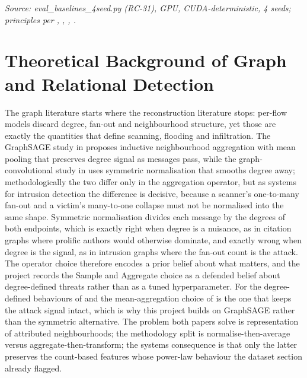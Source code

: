 {\small\textit{Source: eval\_baselines\_4seed.py (RC-31), GPU, CUDA-deterministic, 4 seeds; principles per \cite{k10}, \cite{k12}, \cite{k11}, \cite{k13}.}}

\section{Theoretical Background of Graph and Relational Detection}

The graph literature starts where the reconstruction literature stops: per-flow models discard degree, fan-out and neighbourhood structure, yet those are exactly the quantities that define scanning, flooding and infiltration. The GraphSAGE study in \cite{k14} proposes inductive neighbourhood aggregation with mean pooling that preserves degree signal as messages pass, while the graph-convolutional study in \cite{k15} uses symmetric normalisation that smooths degree away; methodologically the two differ only in the aggregation operator, but as systems for intrusion detection the difference is decisive, because a scanner's one-to-many fan-out and a victim's many-to-one collapse must not be normalised into the same shape. Symmetric normalisation divides each message by the degrees of both endpoints, which is exactly right when degree is a nuisance, as in citation graphs where prolific authors would otherwise dominate, and exactly wrong when degree is the signal, as in intrusion graphs where the fan-out count is the attack. The operator choice therefore encodes a prior belief about what matters, and the project records the Sample and Aggregate choice as a defended belief about degree-defined threats rather than as a tuned hyperparameter. For the degree-defined behaviours of \cite{k5} and \cite{k7} the mean-aggregation choice of \cite{k14} is the one that keeps the attack signal intact, which is why this project builds on GraphSAGE rather than the symmetric alternative. The problem both papers solve is representation of attributed neighbourhoods; the methodology split is normalise-then-average versus aggregate-then-transform; the systems consequence is that only the latter preserves the count-based features whose power-law behaviour the dataset section already flagged.

